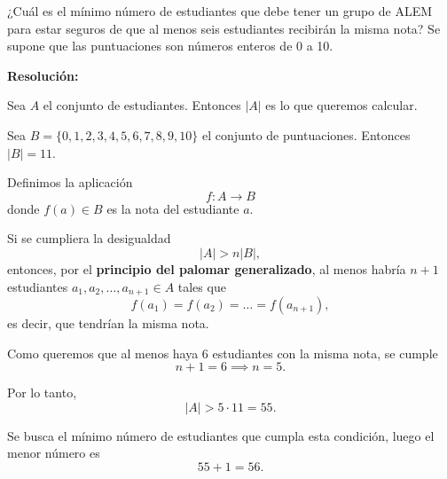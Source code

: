\documentclass[a4paper,12pt]{article}
\begin{document}
\begin{ejercicio}[title=Ejercicio 40]
¿Cuál es el mínimo número de estudiantes que debe tener un grupo de ALEM para estar seguros de que al menos seis estudiantes recibirán la misma nota?  
Se supone que las puntuaciones son números enteros de 0 a 10.

\tcblower
\textbf{Resolución:}

Sea $A$ el conjunto de estudiantes. Entonces $|A|$ es lo que queremos calcular.

Sea $B = \{0,1,2,3,4,5,6,7,8,9,10\}$ el conjunto de puntuaciones. Entonces $|B| = 11$.

\vspace{0.5em}

Definimos la aplicación 
\[
f : A \to B
\] 
donde $f(a) \in B$ es la nota del estudiante $a$.

Si se cumpliera la desigualdad
\[
|A| > n |B|,
\] 
entonces, por el \textbf{principio del palomar generalizado}, al menos habría $n+1$ estudiantes $a_1, a_2, \dots, a_{n+1} \in A$ tales que
\[
f(a_1) = f(a_2) = \dots = f(a_{n+1}),
\] 
es decir, que tendrían la misma nota.

\vspace{0.5em}

Como queremos que al menos haya 6 estudiantes con la misma nota, se cumple
\[
n+1 = 6 \implies n = 5.
\]

Por lo tanto,
\[
|A| > 5 \cdot 11 = 55.
\]

Se busca el mínimo número de estudiantes que cumpla esta condición, luego el menor número es
\[
55 + 1 = \boxed{56}.
\]

\end{ejercicio}
\end{document}
